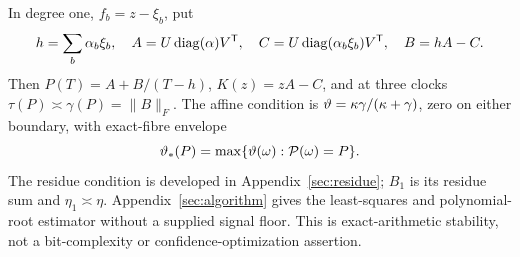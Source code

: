 In degree one, $f_b=z-\xi_b$, put
\begin{equation}\label{eq:affine}
 h=\sum_b\alpha_b\xi_b,\quad
 A=U\operatorname{diag}(\alpha)V^{\mathsf T},\quad
 C=U\operatorname{diag}(\alpha_b\xi_b)V^{\mathsf T},\quad B=hA-C.
\end{equation}
Then $P(T)=A+B/(T-h)$, $K(z)=zA-C$, and at three clocks
$\tau(P)\asymp\gamma(P)=\|B\|_F$.
The affine condition is $\vartheta=\kappa\gamma/(\kappa+\gamma)$,
zero on either boundary, with exact-fibre envelope
\begin{equation}\label{eq:envelope}
 \vartheta_*(P)=\max\{\vartheta(\omega):\mathcal P(\omega)=P\}.
\end{equation}
The residue condition is developed in Appendix~\ref{sec:residue};
$B_1$ is its residue sum and $\eta_1\asymp\eta$.
Appendix~\ref{sec:algorithm} gives the least-squares and polynomial-root
estimator without a supplied signal floor. This is exact-arithmetic
stability, not a bit-complexity or confidence-optimization assertion.
